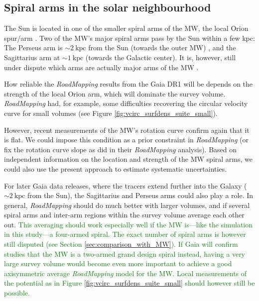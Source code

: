 \documentclass[iop,revtex4,numberedappendix,appendixfloats]{emulateapj}
\newcommand{\RM}{{\sl RoadMapping}}
\newcommand{\NEW}[1]{\textcolor{Green}{#1}}
\begin{document}
\subsection{Spiral arms in the solar neighbourhood} \label{sec:discussion_sun_location}

The Sun is located in one of the smaller spiral arms of the MW, the local Orion spur/arm \citep{1953ApJ...118..318M}. Two of the MW's major spiral arms pass by the Sun within a few kpc: The Perseus arm is $\sim2~\text{kpc}$ from the Sun (towards the outer MW) \citep{2006Sci...311...54X}, and the Sagittarius arm at $\sim1~\text{kpc}$ \citep{2010PASJ...62..287S} (towards the Galactic center). It is, however, still under dispute which arms are actually major arms of the MW \citep{1985IAUS..106..335B,2013ApJ...769...15X,2013ApJ...775...79Z}.

How reliable the \RM{} results from the Gaia DR1 will be depends on the strength of the local Orion arm, which will dominate the survey volume. \RM{} had, for example, some difficulties recovering the circular velocity curve for small volumes (see Figure \ref{fig:vcirc_surfdens_suite_small}).

However, recent measurements of the MW's rotation curve \citep{2012ApJ...759..131B,2014ApJ...783..130R} confirm again that it is flat. We could impose this condition as a prior constraint in \RM{} (or fix the rotation curve slope as \citet{2013ApJ...779..115B} did in their \RM{} analysis). Based on independent information on the location and strength of the MW spiral arms, we could also use the present approach to estimate systematic uncertainties.

For later Gaia data releases, where the tracers extend further into the Galaxy ($\sim2~\text{kpc}$ from the Sun), the Sagittarius and Perseus arms could also play a role. In general, \RM{} should do much better with larger volumes, and if several spiral arms and inter-arm regions within the survey volume average each other out. \NEW{This averaging should work especially well if the MW is---like the simulation in this study---a four-armed spiral. The exact number of spiral arms is however still disputed (see Section \ref{sec:comparison_with_MW}). If Gaia will confirm studies that the MW is a two-armed grand design spiral instead, having a very large survey volume would become even more important to achieve a good axisymmetric average \RM{} model for the MW. Local measurements of the potential as in Figure \ref{fig:vcirc_surfdens_suite_small} should however still be possible.}
\end{document}
